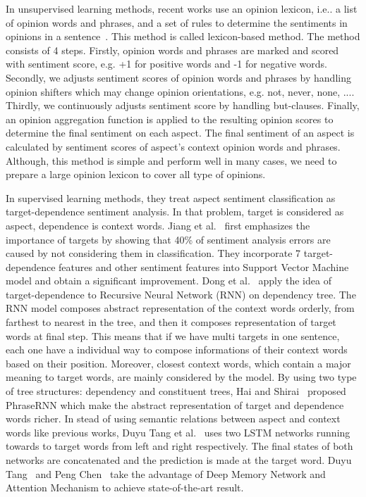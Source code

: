 \documentclass{article}
\begin{document}
In unsupervised learning methods, recent works use an opinion lexicon, i.e.. a list of opinion words and phrases, and a set of rules to determine the sentiments in opinions in a sentence~\cite{17,31}. 
This method is called lexicon-based method.
The method consists of 4 steps.
Firstly, opinion words and phrases are marked and scored with sentiment score, e.g. +1 for positive words and -1 for negative words.
Secondly, we adjusts sentiment scores of opinion words and phrases by handling opinion shifters which may change opinion orientations, e.g. not, never, none, ....
Thirdly, we continuously adjusts sentiment score by handling but-clauses.
Finally, an opinion aggregation function is applied to the resulting opinion scores to determine the final sentiment on each aspect.
The final sentiment of an aspect is calculated by sentiment scores of aspect's context opinion words and phrases.
Although, this method is simple and perform well in many cases, we need to prepare a large opinion lexicon to cover all type of opinions. 


In supervised learning methods, they treat aspect sentiment classification as target-dependence sentiment analysis.
In that problem, target is considered as aspect, dependence is context words.
Jiang et al.~\cite{2011} first emphasizes the importance of targets by showing that 40\% of sentiment analysis errors are caused by not considering them in classification.
They incorporate 7 target-dependence features and other sentiment features into Support Vector Machine model and obtain a significant improvement.
Dong et al.~\cite{Dong2014} apply the idea of target-dependence to Recursive Neural Network (RNN) on dependency tree.
The RNN model composes abstract representation of the context words orderly, from farthest to nearest in the tree, and then it composes representation of target words at final step.
This means that if we have multi targets in one sentence, each one have a individual way to compose informations of their context words based on their position. 
Moreover, closest context words, which contain a major meaning to target words, are mainly considered by the model.
By using two type of tree structures: dependency and constituent trees, Hai and Shirai~\cite{} proposed PhraseRNN which make the abstract representation of target and dependence words richer.
In stead of using semantic relations between aspect and context words like previous works, Duyu Tang et al.~\cite{2016} uses two LSTM networks running towards to target words from left and right respectively. 
The final states of both networks are concatenated and the prediction is made at the target word.
Duyu Tang~\cite{2016} and Peng Chen~\cite{Chen2017} take the advantage of Deep Memory Network and Attention Mechanism to achieve state-of-the-art result.
\end{document}
